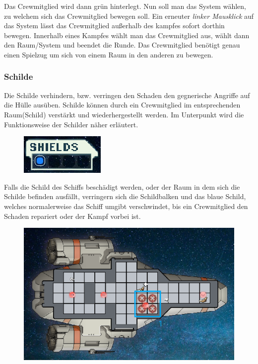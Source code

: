 \documentclass[fontsize=12pt,paper=a4,twoside]{scrartcl}
\begin{document}
Das Crewmitglied wird dann grün hinterlegt. Nun soll man das System wählen, zu welchem sich das Crewmitglied bewegen soll. Ein erneuter \textit{linker Mausklick} auf das System lässt das Crewmitglied außerhalb des kampfes sofort dorthin bewegen. Innerhalb eines Kampfes wählt man das Crewmitglied aus, wählt dann den Raum/System und beendet die Runde. Das Crewmitglied benötigt genau einen Spielzug um sich von einem Raum in den anderen zu bewegen.



\subsubsection{Schilde}
Die Schilde verhindern, bzw. verringen den Schaden den gegnerische Angriffe auf die Hülle ausüben. Schilde können durch ein Crewmitglied im entsprechenden Raum(Schild) verstärkt und wiederhergestellt werden. Im Unterpunkt  wird die Funktionsweise der Schilder näher erläutert.
\begin{figure}[H]
\centering
\includegraphics[width=0.4\linewidth]{DasSpiel/Ui/shield.png}
\end{figure}
Falls die Schild des Schiffs beschädigt werden, oder der Raum in dem sich die Schilde befinden ausfällt, verringern sich die Schildbalken und das blaue Schild, welches normalerweise das Schiff umgibt verschwindet, bis ein Crewmitglied den Schaden repariert oder der Kampf vorbei ist.

\begin{figure}[H]
\centering
\includegraphics[width=0.9\linewidth]{DasSpiel/Ui/shield_off.png}
\end{figure}
\end{document}

